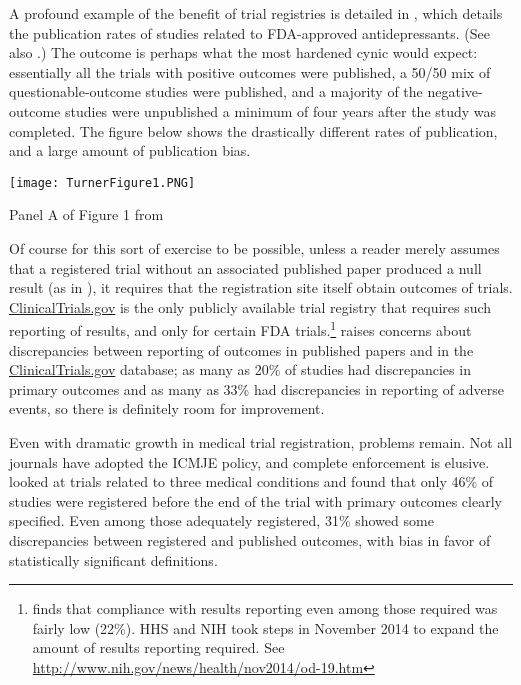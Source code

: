 \documentclass[12pt] {article}
\begin{document}
A profound example of the benefit of trial registries is detailed in
\cite{turner_selective_2008}, which details the publication rates of studies
related to FDA-approved antidepressants. (See also \cite{ioannidis_effectiveness_2008}.)
The outcome is perhaps what the most hardened cynic would expect:
essentially all the trials with positive outcomes were published, a
50/50 mix of questionable-outcome studies were published, and a majority of the
negative-outcome studies were unpublished a minimum of four years after the
study was completed. The figure below shows the drastically different
rates of publication, and a large amount of publication bias.
\begin{center}
\texttt{[image: TurnerFigure1.PNG]}

Panel A of Figure 1 from \cite{turner_selective_2008}
\end{center}
Of course for this sort of exercise to be possible, unless a reader
merely assumes that a registered trial without an associated published
paper produced a null result (as in \cite{rosenthal1979file}), it requires that the registration site
itself obtain outcomes of trials. \href{http://www.clinicaltrials.gov}{ClinicalTrials.gov} is the only
publicly available trial registry that requires such reporting of
results, and only for certain FDA trials.\footnote{\cite{resultscompliance} finds that compliance with results reporting even among those required was fairly low (22\%). HHS and NIH took steps in November 2014 to expand the amount of results reporting required. See \url{http://www.nih.gov/news/health/nov2014/od-19.htm}}  \cite{hartung_reporting_2014} raises
concerns about discrepancies between reporting of outcomes in published
papers and in the \href{http://www.clinicaltrials.gov}{ClinicalTrials.gov} database; as many as 20\% of
studies had discrepancies in primary outcomes and as many as 33\% had
discrepancies in reporting of adverse events, so there is definitely room for improvement. 

Even with dramatic growth in medical trial registration, problems
remain. Not all journals have adopted the ICMJE policy, and complete
enforcement is elusive. \cite{mathieu_s_comparison_2009} looked at trials related
to three medical conditions and found that only 46\% of studies were
registered before the end of the trial with primary outcomes clearly
specified. Even among those adequately registered, 31\% showed some
discrepancies between registered and published outcomes, with bias in
favor of statistically significant definitions.
\end{document}
